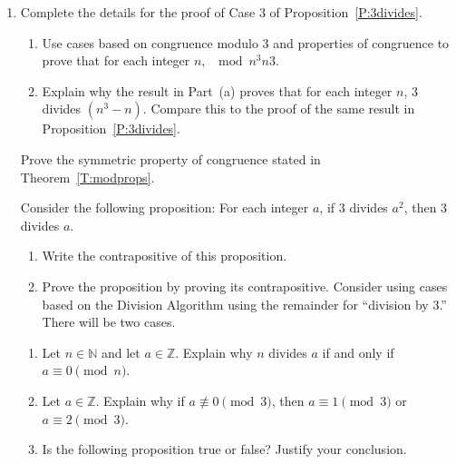 \begin{enumerate}
\item \label{exer:prop3divides} 
Complete the details for the proof of Case 3 of Proposition~\ref{P:3divides}.


\xitem \begin{enumerate} \label{exer:sec35-2}
 \item Use cases based on congruence modulo 3 and properties of congruence to prove that for each integer $n$, 
$\mod{n^3}{n}{3}$.
 \item Explain why the result in Part~(a) proves that for each integer $n$, 3 divides $\left(n^3 - n \right)$.  Compare this to the  proof of the same result in Proposition~\ref{P:3divides}.
\end{enumerate}




\xitem %
Prove the symmetric property of congruence stated in Theorem~\ref{T:modprops}.
\label{exer:cong-symm}%

\xitem Consider the following proposition:  \label{exer:sec35-a2mod3}
For each integer $a$, if 3 divides $a^2$, then 3 divides $a$.
\begin{enumerate}
  \item Write the contrapositive of this proposition.
  \item Prove the proposition by proving its contrapositive.  \hint Consider using cases based on the Division Algorithm using the remainder for  ``division by 3.''  There will be two cases.
\end{enumerate}

\xitem \label{exer:sec34-4} \begin{enumerate} \item Let  $n \in \mathbb{N}$ and let  $a \in \mathbb{Z}$.  Explain why  $n$ divides $a$  if and only if  
\linebreak $a \equiv 0 \pmod n$. 

  \item Let  $a \in \mathbb{Z}$.  Explain why  if  $a \not \equiv 0 \pmod 3$, then  $a \equiv 1\pmod 3$ or  $a \equiv 2 \pmod 3$.

  \item Is the following proposition true or false?  Justify your conclusion.

\end{enumerate}



\end{enumerate}
